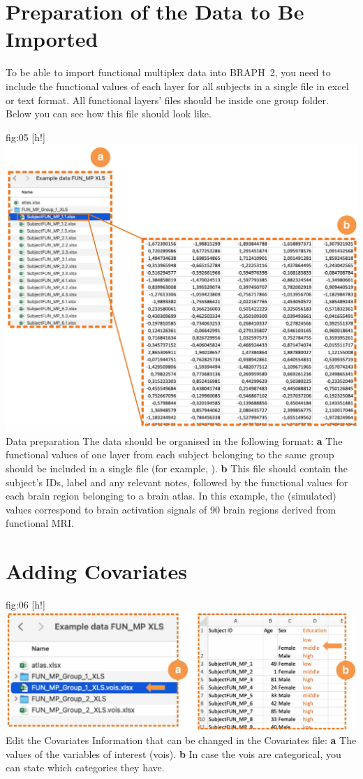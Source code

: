 \documentclass[justified]{tufte-handout}
\begin{document}

\clearpage
\section{Preparation of the Data to Be Imported}

To be able to import functional multiplex data into BRAPH~2, you need to include the functional values of each layer for all subjects in a single file in excel or text format. All functional layers' files should be inside one group folder. Below you can see how this file should look like.

	{fig:05}
	{
	[h!]
	\includegraphics{fig05.jpg}
	}
	{Data preparation}
	{
	The data should be organised in the following format:
	{\bf a} The functional values of one layer from each subject belonging to the same group should be included in a single file (for example, ). 
	{\bf b} This file should contain the subject's IDs, label and any relevant notes, followed by the functional values for each brain region belonging to a brain atlas. In this example, the (simulated) values correspond to brain activation signals of 90 brain regions derived from functional MRI.
	}


\section{Adding Covariates}

	{fig:06}
	{
	[h!]
	\includegraphics{fig06.jpg}
	}
	{Edit the Covariates}
	{
	Information that can be changed in the Covariates file: 
	{\bf a} The values of the variables of interest (vois).
	{\bf b} In case the vois are categorical, you can state which categories they have.
	}
	
\end{document}
